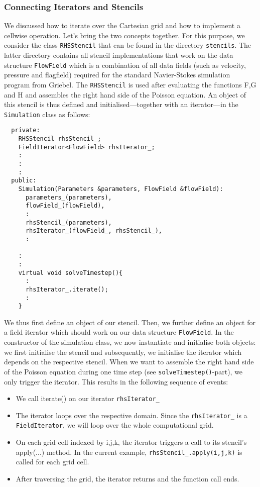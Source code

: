 \documentclass[pdftex,A4]{article}
\begin{document}
\subsubsection{Connecting Iterators and Stencils}\label{sec:connecting_iterators_and_stencils}
We discussed how to iterate over the Cartesian grid and how to implement a cellwise operation.
Let's bring the two concepts together. For this purpose, we consider the class {\tt RHSStencil} that can be found in the directory {\tt stencils}.
The latter directory contains all stencil implementations that work on the data structure {\tt FlowField} which is a combination of all data fields
(such as velocity, pressure and flagfield) required for the standard Navier-Stokes simulation program from Griebel.
The {\tt RHSStencil} is used after evaluating the functions F,G and H and assembles the right hand side of the Poisson equation.
An object of this stencil is thus defined and initialised---together with an iterator---in the {\tt Simulation} class as follows:
\begin{verbatim}
  private:
    RHSStencil rhsStencil_;
    FieldIterator<FlowField> rhsIterator_;
    :
    :
    :
  public:
    Simulation(Parameters &parameters, FlowField &flowField):
      parameters_(parameters),
      flowField_(flowField),
      :
      rhsStencil_(parameters),
      rhsIterator_(flowField_, rhsStencil_),
      :

    :
    :
    virtual void solveTimestep(){
      :
      rhsIterator_.iterate();
      :
    }
\end{verbatim}
We thus first define an object of our stencil.
Then, we further define an object for a field iterator which should work on our data structure {\tt FlowField}.
In the constructor of the simulation class, we now instantiate and initialise both objects:
we first initialise the stencil and subsequently, we initialise the iterator which depends on the respective stencil.
When we want to assemble the right hand side of the Poisson equation during one time step (see {\tt solveTimestep()}-part), we only trigger the iterator.
This results in the following sequence of events:
  \begin{itemize}
  \item We call iterate() on our iterator {\tt rhsIterator\_}
  \item The iterator loops over the respective domain. Since the {\tt rhsIterator\_} is a {\tt FieldIterator}, we will loop over the whole computational grid.
  \item On each grid cell indexed by i,j,k, the iterator triggers a call to its  stencil's apply(...) method. In the current example, {\tt rhsStencil\_.apply(i,j,k)} is called for each grid cell.
  \item After traversing the grid, the iterator returns and the function call ends.
  \end{itemize}
\end{document}
